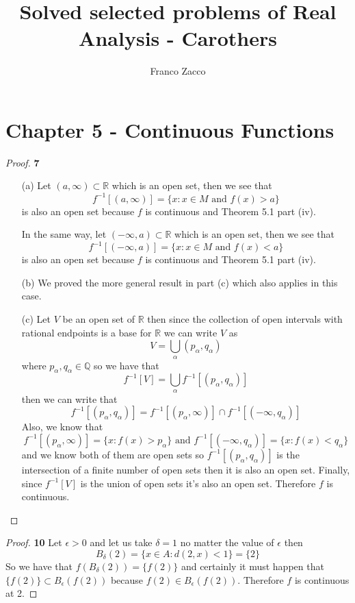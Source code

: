 \documentclass[11pt]{article}
\title{\textbf{Solved selected problems of Real Analysis - Carothers}}
\author{Franco Zacco}
\date{}
\newcommand{\Q}{\mathbb{Q}}
\newcommand{\R}{\mathbb{R}}
\theoremstyle{definition}
\begin{document}
\maketitle
\thispagestyle{empty}

\section*{Chapter 5 - Continuous Functions}

	\begin{proof}{\textbf{7}}
    \begin{itemize}
        \item [(a)] Let $(a, \infty) \subset \R$ which is an open set, then
        we see that
        $$f^{-1}[(a,\infty)] = \{x: x \in M \text{ and } f(x) > a\}$$
        is also an open set because $f$ is continuous and Theorem 5.1
        part (iv).

        In the same way, let $(-\infty, a) \subset \R$ which is an open set,
        then we see that
        $$f^{-1}[(-\infty,a)] = \{x: x \in M \text{ and } f(x) < a\}$$
        is also an open set because $f$ is continuous and Theorem 5.1
        part (iv).

        \item [(b)] We proved the more general result in part (c) which also
        applies in this case.

        \item [(c)] Let $V$ be an open set of $\R$ then since the collection of
        open intervals with rational endpoints is a base for $\R$ we can write
        $V$ as
        $$V = \bigcup_\alpha (p_\alpha, q_\alpha)$$
        where $p_\alpha, q_\alpha \in \Q$ so we have that
        $$f^{-1}[V] = \bigcup_\alpha f^{-1}[(p_\alpha, q_\alpha)]$$
        then we can write that
        $$f^{-1}[(p_\alpha, q_\alpha)] =
        f^{-1}[(p_\alpha, \infty)] \cap f^{-1}[(-\infty, q_\alpha)]$$
        Also, we know that
        $$f^{-1}[(p_\alpha, \infty)] = \{x: f(x) > p_\alpha\}
        \text{ and } f^{-1}[(-\infty, q_\alpha)] = \{x: f(x) < q_\alpha\}$$
         and we know
        both of them are open sets so $f^{-1}[(p_\alpha,q_\alpha)]$ is
        the intersection of a finite number of open sets then it is also an open
        set. Finally, since $f^{-1}[V]$ is the union of open sets it's also
        an open set. Therefore $f$ is continuous. 
    \end{itemize}
    \end{proof}
    \begin{proof}{\textbf{10}}
        Let $\epsilon > 0$ and let us take $\delta = 1$ no matter the value of
        $\epsilon$ then
        $$B_\delta(2) = \{x \in A: d(2,x) < 1\} = \{2\}$$
        So we have that $f(B_\delta(2)) = \{f(2)\}$ and certainly it must happen
        that $\{f(2)\} \subset B_\epsilon(f(2))$ because
        $f(2) \in B_\epsilon(f(2))$. Therefore $f$ is continuous at 2.
    \end{proof}
\end{document}
